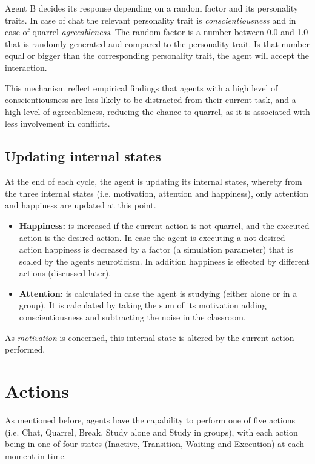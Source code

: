 \bb

Agent B decides its response depending on a random factor and its personality traits.
In case of chat the relevant personality trait is \textit{conscientiousness} and
in case of quarrel \textit{agreeableness}. The random factor is a number between 0.0
and 1.0 that is randomly generated and compared to the personality trait.
Is that number equal or bigger than the corresponding personality trait, the agent
will accept the interaction.

\bb

This mechanism reflect empirical findings that agents with a high level of
conscientiousness are less likely to be distracted from their current task,
and a high level of agreeableness, reducing the chance to quarrel, as it is associated
with less involvement in conflicts.

\subsection{Updating internal states}
At the end of each cycle, the agent is updating its internal states, whereby
from the three internal states (i.e. motivation, attention and happiness), only attention
and happiness are updated at this point.

\begin{itemize}
    \item \textbf{Happiness:} is increased if the current action is not quarrel,
    and the executed action is the desired action. In case the agent
    is executing a not desired action happiness is decreased by a factor (a
    simulation parameter) that is scaled by the agents neuroticism. In addition
    happiness is effected by different actions (discussed later).
    \item \textbf{Attention:} is calculated in case the agent is studying (either
    alone or in a group). It is calculated by taking the sum of its motivation
    adding conscientiousness and subtracting the noise in the classroom.
\end{itemize}

As \textit{motivation} is concerned, this internal state is altered by the current action performed.

\section{Actions}
As mentioned before, agents have the capability to perform one of five actions (i.e.
Chat, Quarrel, Break, Study alone and Study in groups),
with each action being in one of four states (Inactive, Transition, Waiting and Execution)
at each moment in time.

